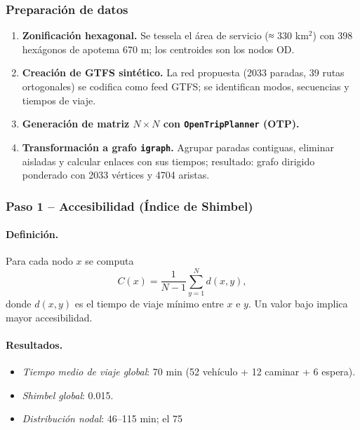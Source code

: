 \documentclass[11pt]{article}
\begin{document}
		\subsubsection*{Preparación de datos}
		\begin{enumerate}
		  \item \textbf{Zonificación hexagonal.} Se tessela el área de servicio (≈ 330 km$^{2}$) con 398 hexágonos de apotema 670 m; los centroides son los nodos OD.
		  \item \textbf{Creación de GTFS sintético.} La red propuesta (2033 paradas, 39 rutas ortogonales) se codifica como feed GTFS; se identifican modos, secuencias y tiempos de viaje.
		  \item \textbf{Generación de matriz $N\times N$ con \texttt{OpenTripPlanner} (OTP).}
		  \item \textbf{Transformación a grafo \texttt{igraph}.} Agrupar paradas contiguas, eliminar aisladas y calcular enlaces con sus tiempos; resultado: grafo dirigido ponderado con 2033 vértices y 4704 aristas.
		\end{enumerate}

		\subsubsection*{Paso 1 – Accesibilidad (Índice de Shimbel)}
		\paragraph{Definición.} Para cada nodo $x$ se computa
		\[
		C(x)=\frac{1}{N-1}\sum_{y=1}^{N} d(x,y),
		\]
		donde $d(x,y)$ es el tiempo de viaje mínimo entre $x$ e $y$. Un valor bajo implica mayor accesibilidad.

		\paragraph{Resultados.}
		\begin{itemize}
		  \item \textit{Tiempo medio de viaje global}: 70 min (52 vehículo + 12 caminar + 6 espera).
		  \item \textit{Shimbel global}: 0.015.
		  \item \textit{Distribución nodal}: 46–115 min; el 75 %
		\end{itemize}
\end{document}
